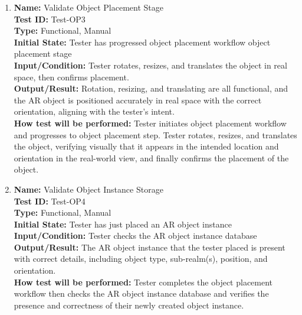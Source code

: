 \documentclass[12pt, titlepage]{article}
\begin{document}
\begin{enumerate}
  \item \textbf{Name:} Validate Object Placement Stage \label{itm:Test-OP3} \\
        \textbf{Test ID:} Test-OP3 \\
        \textbf{Type:} Functional, Manual \\
        \textbf{Initial State:} Tester has progressed object placement workflow object placement stage \\
        \textbf{Input/Condition:} Tester rotates, resizes, and translates the object in real space, then confirms placement. \\
        \textbf{Output/Result:} Rotation, resizing, and translating are all functional, and the AR object is positioned accurately in real space with the correct orientation, aligning with the tester's intent. \\
        \textbf{How test will be performed:} Tester initiates object placement workflow and progresses to object placement step. Tester rotates, resizes, and translates the object, verifying visually that it appears in the intended location and orientation in the real-world view, and finally confirms the placement of the object.

  \item \textbf{Name:} Validate Object Instance Storage \label{itm:Test-OP4} \\
        \textbf{Test ID:} Test-OP4 \\
        \textbf{Type:} Functional, Manual \\
        \textbf{Initial State:} Tester has just placed an AR object instance \\
        \textbf{Input/Condition:} Tester checks the AR object instance database \\
        \textbf{Output/Result:} The AR object instance that the tester placed is present with correct details, including object type, sub-realm(s), position, and orientation. \\
        \textbf{How test will be performed:} Tester completes the object placement workflow then checks the AR object instance database and verifies the presence and correctness of their newly created object instance.



\end{enumerate}
\end{document}
